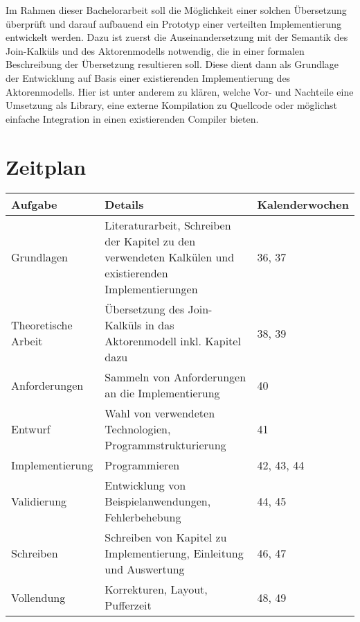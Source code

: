 \documentclass[12pt]{article}
\begin{document}
Im Rahmen dieser Bachelorarbeit soll die Möglichkeit einer solchen Übersetzung überprüft und darauf aufbauend ein Prototyp einer verteilten Implementierung entwickelt werden.
Dazu ist zuerst die Auseinandersetzung mit der Semantik des Join-Kalküls und des Aktorenmodells notwendig, die in einer formalen Beschreibung der Übersetzung resultieren soll.
Diese dient dann als Grundlage der Entwicklung auf Basis einer existierenden Implementierung des Aktorenmodells.
Hier ist unter anderem zu klären, welche Vor- und Nachteile eine Umsetzung als Library, eine externe Kompilation zu Quellcode oder möglichst einfache Integration in einen existierenden Compiler bieten.

\section*{Zeitplan}

\begin{tabular}{| p{3cm} | p{7cm} | p{3cm} |}
  \hline
    Aufgabe &
    Details &
    Kalenderwochen \\
  \hline
    Grundlagen &
    Literaturarbeit, Schreiben der Kapitel zu den verwendeten Kalkülen und existierenden Implementierungen &
    36, 37 \\
  \hline
    Theoretische \newline Arbeit &
    Übersetzung des Join-Kalküls in das Aktorenmodell inkl. Kapitel dazu &
    38, 39 \\
  \hline
    Anforderungen &
    Sammeln von Anforderungen an die Implementierung &
    40 \\
  \hline
    Entwurf &
    Wahl von verwendeten Technologien, Programmstrukturierung &
    41 \\
  \hline
    Implementierung &
    Programmieren &
    42, 43, 44 \\
  \hline
    Validierung &
    Entwicklung von Beispiel\-anwendungen, Fehlerbehebung &
    44, 45 \\
  \hline
    Schreiben &
    Schreiben von Kapitel zu Implementierung, Einleitung und Auswertung &
    46, 47 \\
  \hline
    Vollendung &
    Korrekturen, Layout, Pufferzeit &
    48, 49 \\
  \hline
\end{tabular}

\nocite{levy_results_1997}
\nocite{maranget_compiling_1998}

{}

\end{document}
